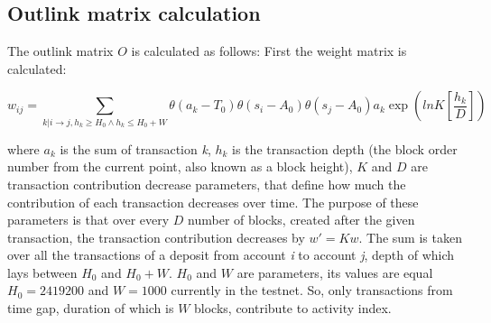 \documentclass[a4paper,12pt]{article}
\begin{document}

\subsection{Outlink matrix calculation}

The outlink matrix $O$ is calculated as follows: First the weight matrix is calculated:


$$
w_{ij}=\sum_{k|i \to j, {h_k \ge H_0} \land {h_k \le H_0+W}} \theta ( a_k - T_0 ) \theta ( s_i - A_0 ) \theta ( s_j - A_0 ) a_k \exp{(lnK [\frac{h_k}{D}])}
$$

where $a_k$ is the sum of transaction \textit{k}, $h_k$ is the transaction depth (the block order number from the current point, also known as a block height),  $K$ and $D$ are transaction contribution decrease parameters, that define how much the contribution of each transaction decreases over time. The purpose of these parameters is that over every $D$ number of blocks, created after the given transaction, the transaction contribution decreases by $w'=Kw$. The sum is taken over all the transactions of a deposit from account \textit{i} to account \textit{j}, depth of which lays between $H_0$ and $H_0+W$. $H_0$ and $W$ are parameters, its values are equal $H_0=2419200$ and $W=1000$ currently in the testnet. So, only transactions from time gap, duration of which is $W$ blocks, contribute to activity index.



\end{document}
